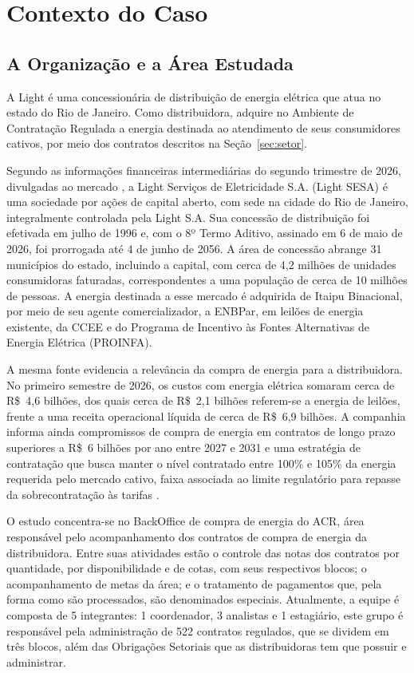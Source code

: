 \section{Contexto do Caso}
\label{sec:contexto}

\subsection{A Organização e a Área Estudada}

A Light é uma concessionária de distribuição de energia elétrica que atua no estado do Rio de Janeiro. Como distribuidora, adquire no Ambiente de Contratação Regulada a energia destinada ao atendimento de seus consumidores cativos, por meio dos contratos descritos na Seção~\ref{sec:setor}.

Segundo as informações financeiras intermediárias do segundo trimestre de 2026, divulgadas ao mercado \citep{light2026itr}, a Light Serviços de Eletricidade S.A. (Light SESA) é uma sociedade por ações de capital aberto, com sede na cidade do Rio de Janeiro, integralmente controlada pela Light S.A. Sua concessão de distribuição foi efetivada em julho de 1996 e, com o 8º Termo Aditivo, assinado em 6 de maio de 2026, foi prorrogada até 4 de junho de 2056. A área de concessão abrange 31 municípios do estado, incluindo a capital, com cerca de 4,2 milhões de unidades consumidoras faturadas, correspondentes a uma população de cerca de 10 milhões de pessoas. A energia destinada a esse mercado é adquirida de Itaipu Binacional, por meio de seu agente comercializador, a ENBPar, em leilões de energia existente, da CCEE e do Programa de Incentivo às Fontes Alternativas de Energia Elétrica (PROINFA).

A mesma fonte evidencia a relevância da compra de energia para a distribuidora. No primeiro semestre de 2026, os custos com energia elétrica somaram cerca de R\$~4,6 bilhões, dos quais cerca de R\$~2,1 bilhões referem-se a energia de leilões, frente a uma receita operacional líquida de cerca de R\$~6,9 bilhões. A companhia informa ainda compromissos de compra de energia em contratos de longo prazo superiores a R\$~6 bilhões por ano entre 2027 e 2031 e uma estratégia de contratação que busca manter o nível contratado entre 100\% e 105\% da energia requerida pelo mercado cativo, faixa associada ao limite regulatório para repasse da sobrecontratação às tarifas \citep{light2026itr}.

O estudo concentra-se no BackOffice de compra de energia do ACR, área responsável pelo acompanhamento dos contratos de compra de energia da distribuidora. Entre suas atividades estão o controle das notas dos contratos por quantidade, por disponibilidade e de cotas, com seus respectivos blocos; o acompanhamento de metas da área; e o tratamento de pagamentos que, pela forma como são processados, são denominados especiais. Atualmente, a equipe é composta de 5 integrantes: 1 coordenador, 3 analistas e 1 estagiário, este grupo é responsável pela administração de 522 contratos regulados, que se dividem em três blocos, além das Obrigações Setoriais que as distribuidoras tem que possuir e administrar.

